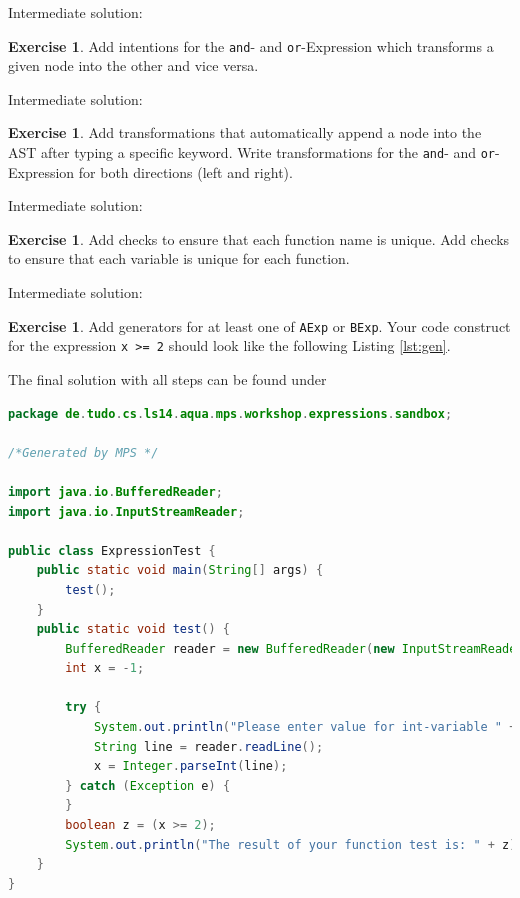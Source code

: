 \documentclass[a4paper,oneside,DIV8,10pt]{scrartcl}
\theoremstyle{definition}
\newtheorem{aufgabe}[satz]{Exercise}
\begin{document}
	Intermediate solution: 
	
	\begin{aufgabe}
		Add intentions for the \texttt{and}- and \texttt{or}-Expression which transforms a given node into the other and vice versa.
	\end{aufgabe}

	Intermediate solution: 
	
	\begin{aufgabe}
		Add transformations that automatically append a node into the AST after typing a specific keyword. Write transformations for the \texttt{and}- and \texttt{or}-Expression for both directions (left and right).
	\end{aufgabe}
	
	Intermediate solution: 
	
	\begin{aufgabe}
	Add checks to ensure that each function name is unique. Add checks to ensure that each variable is unique for each function.
	\end{aufgabe}

	Intermediate solution: 
	
	\begin{aufgabe}
		Add generators for at least one of \texttt{AExp} or \texttt{BExp}. Your code construct for the expression \texttt{x >= 2} should look like the following  Listing \ref{lst:gen}.
	\end{aufgabe}

	The final solution with all steps can be found under 
	
	\newpage
		
		\begin{lstlisting}[language=Java,caption={Generated Java code that parses the variables and returns the result of the defined expression}, captionpos=b, label={lst:gen}]
package de.tudo.cs.ls14.aqua.mps.workshop.expressions.sandbox;

/*Generated by MPS */

import java.io.BufferedReader;
import java.io.InputStreamReader;

public class ExpressionTest {
	public static void main(String[] args) {
		test();
	}
	public static void test() {
		BufferedReader reader = new BufferedReader(new InputStreamReader(System.in));
		int x = -1;
		
		try {
			System.out.println("Please enter value for int-variable " + "x");
			String line = reader.readLine();
			x = Integer.parseInt(line);
		} catch (Exception e) {
		}
		boolean z = (x >= 2);
		System.out.println("The result of your function test is: " + z);
	}
}
		\end{lstlisting}


\end{document}
